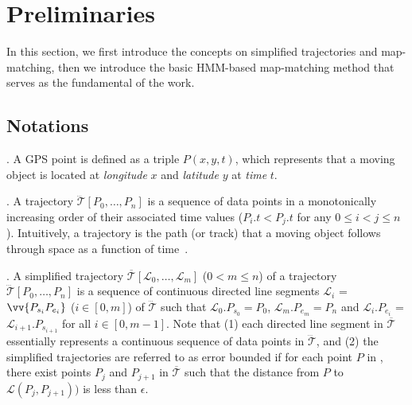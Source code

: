 



\section{Preliminaries}
\label{sec-pre}




In this section, we first introduce the concepts on simplified trajectories and map-matching, then we introduce the basic HMM-based map-matching method that serves as the fundamental of the work.

\subsection{Notations}


. A GPS point is defined as a triple $P(x, y, t)$,
which represents that a moving object is located at {\em longitude} $x$ and {\em
  latitude} $y$ at {\em time} $t$.

. A trajectory
$\dddot{\mathcal{T}}[P_0, \ldots, P_n]$ is a sequence of data points in a
monotonically increasing order of their associated time values ($P_i.t <
P_j.t$ for any $0\le i<j\le n$). Intuitively, a trajectory is the path (or
track) that a moving object follows through space as a function of time~\cite{physics-trajectory}.



. A simplified trajectory $\overline{\mathcal{T}}[\mathcal{L}_0, \ldots , \mathcal{L}_m]$ ($0< m \le n$) of a trajectory $\dddot{\mathcal{T}}[P_0, \ldots, P_n]$ is a sequence of continuous directed line segments $\mathcal{L}_{i}$ = $\vv{P_{s_i}P_{e_i}}$ ($i\in[0,m]$) of $\dddot{\mathcal{T}}$  such that $\mathcal{L}_{0}.P_{s_0} = P_0$, $\mathcal{L}_{m}.P_{e_m} = P_n$ and  $\mathcal{L}_{i}.P_{e_i}$ = $\mathcal{L}_{i+1}.P_{s_{i+1}}$ for all $i\in[0, m-1]$.
Note that (1) each directed line segment in $\overline{\mathcal{T}}$ essentially represents a continuous sequence of data points in $\dddot{\mathcal{T}}$, and
(2) the simplified trajectories are referred to {as} error bounded if for each point $P$ in , there exist points $P_j$ and $P_{j+1}$ in $\overline{\mathcal{T}}$ such that the distance from $P$ to $\mathcal{L}(P_j,P_{j+1}))$ is less than $\epsilon$.


